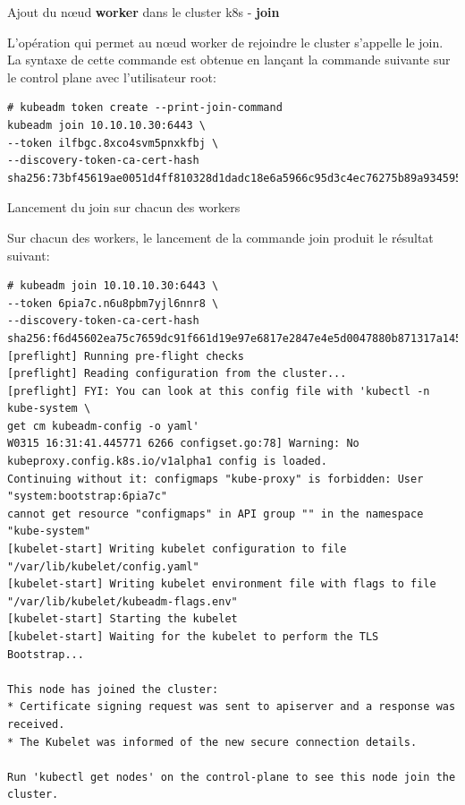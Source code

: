 
\begin{frame}[shrink=8,fragile]{Ajout du n{\oe}ud \textbf{worker} dans le cluster k8s - \textbf{join}}

   L'opération qui permet au n{\oe}ud worker de rejoindre le cluster s'appelle le join.\\
   La syntaxe de cette commande est obtenue en lançant la commande suivante sur le control plane avec l'utilisateur root:

\begin{tiny}
\begin{Verbatim}[commandchars=\&\@\@]
# kubeadm token create --print-join-command
kubeadm join 10.10.10.30:6443 \
--token ilfbgc.8xco4svm5pnxkfbj \
--discovery-token-ca-cert-hash sha256:73bf45619ae0051d4ff810328d1dadc18e6a5966c95d3c4ec76275b89a934595 
\end{Verbatim}
\end{tiny}

\end{frame}


\begin{frame}[fragile]{Lancement du join sur chacun des workers}

Sur chacun des workers, le lancement de la commande join produit le résultat suivant:
\begin{tcolorbox}
\begin{tiny}
\begin{Verbatim}[commandchars=\&\@\@]
# kubeadm join 10.10.10.30:6443 \
--token 6pia7c.n6u8pbm7yjl6nnr8 \
--discovery-token-ca-cert-hash sha256:f6d45602ea75c7659dc91f661d19e97e6817e2847e4e5d0047880b871317a145
[preflight] Running pre-flight checks
[preflight] Reading configuration from the cluster...
[preflight] FYI: You can look at this config file with 'kubectl -n kube-system \
get cm kubeadm-config -o yaml'
W0315 16:31:41.445771 6266 configset.go:78] Warning: No kubeproxy.config.k8s.io/v1alpha1 config is loaded.
Continuing without it: configmaps "kube-proxy" is forbidden: User "system:bootstrap:6pia7c"
cannot get resource "configmaps" in API group "" in the namespace "kube-system"
[kubelet-start] Writing kubelet configuration to file "/var/lib/kubelet/config.yaml"
[kubelet-start] Writing kubelet environment file with flags to file "/var/lib/kubelet/kubeadm-flags.env"
[kubelet-start] Starting the kubelet
[kubelet-start] Waiting for the kubelet to perform the TLS Bootstrap...

This node has joined the cluster:
* Certificate signing request was sent to apiserver and a response was received.
* The Kubelet was informed of the new secure connection details.

Run 'kubectl get nodes' on the control-plane to see this node join the cluster.
\end{Verbatim}
\end{tiny}
\end{tcolorbox}

\end{frame}

